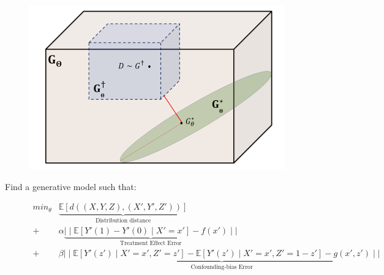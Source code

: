 \documentclass{beamer}
\begin{document}
\begin{frame}
	\frametitle{}
	\begin{figure}
		\centering
		\includegraphics[scale=0.45]{imgs/distributions.png}
	\end{figure}
	Find a generative model such that:
		\begin{figure}
		\begin{equation*}
			\begin{split}
				min_{\theta} & \underbrace{\mathbb{E}[d((X, Y, Z), (X', Y', Z'))]}_{\text{Distribution distance}} \\
				+ & \alpha \underbrace{\mid\mid \mathbb{E}[Y'(1) - Y'(0) \mid X'=x'] - f(x') \mid \mid}_{\text{Treatment Effect Error}}  \\
				+ & \beta \underbrace{\mid \mid \mathbb{E}[Y'(z') \mid X'=x', Z'=z'] - \mathbb{E}[Y'(z') \mid X'=x', Z'=1-z'] - g(x', z') \mid \mid}_{\text{Confounding-bias Error}} \\
			\end{split}
		\end{equation*}
		\end{figure}
\end{frame}
\end{document}
